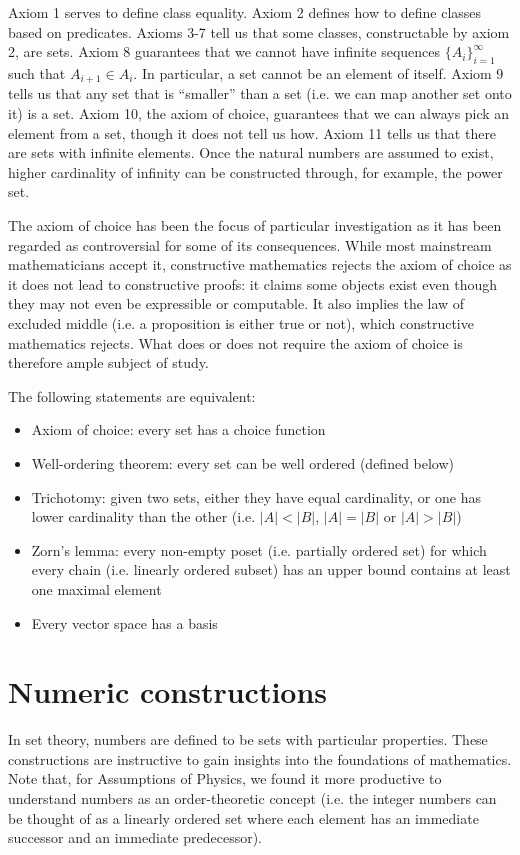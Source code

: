 \documentclass{article}
\begin{document}
\begin{remark}
	Axiom 1 serves to define class equality. Axiom 2 defines how to define classes based on predicates. Axioms 3-7 tell us that some classes, constructable by axiom 2, are sets. Axiom 8 guarantees that we cannot have infinite sequences $\{ A_i \}_{i=1}^\infty$ such that $A_{i+1} \in A_i$. In particular, a set cannot be an element of itself. Axiom 9 tells us that any set that is ``smaller'' than a set (i.e. we can map another set onto it) is a set. Axiom 10, the axiom of choice, guarantees that we can always pick an element from a set, though it does not tell us how. Axiom 11 tells us that there are sets with infinite elements. Once the natural numbers are assumed to exist, higher cardinality of infinity can be constructed through, for example, the power set.
\end{remark}

The axiom of choice has been the focus of particular investigation as it has been regarded as controversial for some of its consequences. While most mainstream mathematicians accept it, constructive mathematics rejects the axiom of choice as it does not lead to constructive proofs: it claims some objects exist even though they may not even be expressible or computable. It also implies the law of excluded middle (i.e. a proposition is either true or not), which constructive mathematics rejects. What does or does not require the axiom of choice is therefore ample subject of study.

\begin{prop}
	The following statements are equivalent:
	\begin{itemize}
		\item Axiom of choice: every set has a choice function
		\item Well-ordering theorem: every set can be well ordered (defined below)
		\item Trichotomy: given two sets, either they have equal cardinality, or one has lower cardinality than the other (i.e. $|A| < |B|$, $|A| = |B|$ or $|A| > |B|$)
		\item Zorn's lemma: every non-empty poset (i.e. partially ordered set) for which every chain (i.e. linearly ordered subset) has an upper bound contains at least one maximal element
		\item Every vector space has a basis
	\end{itemize}
\end{prop}

\section{Numeric constructions}
In set theory, numbers are defined to be sets with particular properties. These constructions are instructive to gain insights into the foundations of mathematics. Note that, for Assumptions of Physics, we found it more productive to understand numbers as an order-theoretic concept (i.e. the integer numbers can be thought of as a linearly ordered set where each element has an immediate successor and an immediate predecessor).
\end{document}
